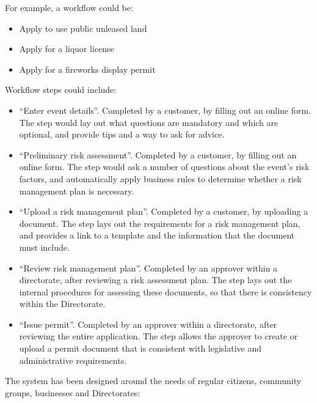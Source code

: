 \documentclass[12pt,a4paper,twosided]{article}
\begin{document}
\begin{framed}
For example, a workflow could be:

\begin{itemize}

\item
  Apply to use public unleased land
\item
  Apply for a liquor license
\item
  Apply for a fireworks display permit
\end{itemize}

Workflow steps could include:

\begin{itemize}

\item
  ``Enter event details''. Completed by a customer, by filling out an
  online form. The step would lay out what questions are mandatory and
  which are optional, and provide tips and a way to ask for advice.
\item
  ``Preliminary risk assessment''. Completed by a customer, by filling out an online form. The step would ask a number of questions about the event's risk factors, and automatically apply business rules to determine whether a risk management plan is necessary.
\item
  ``Upload a risk management plan''. Completed by a customer, by
  uploading a document. The step lays out the requirements for a risk
  management plan, and provides a link to a template and the information
  that the document must include.
\item
  ``Review risk management plan''. Completed by an approver within a
  directorate, after reviewing a risk assessment plan. The step lays out
  the internal procedures for assessing these documents, so that there
  is consistency within the Directorate.
\item
  ``Issue permit''. Completed by an approver within a directorate, after reviewing the entire application. The step allows the approver to create or upload a permit document that is consistent with legislative and administrative requirements.
\end{itemize}
\end{framed}

The system has been designed around the needs of regular citizens,
community groups, businesses and Directorates:
\end{document}
